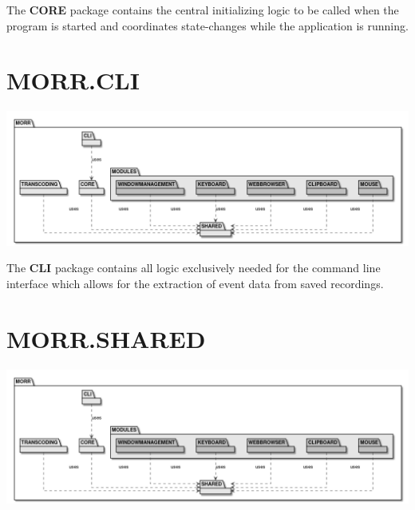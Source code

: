 The \textbf{CORE} package contains the central initializing logic to be called when the program is started and coordinates state-changes while the application is running.

\begin{packclass}
\end{packclass}

\begin{packif}
\end{packif}

\newpage
\section{MORR.CLI}

\begin{center}
    \includegraphics[width=1.0\textwidth]{resources/Packages/AllPackages.png}
\end{center}

The \textbf{CLI} package contains all logic exclusively needed for the command line interface which allows for the extraction of event data from saved recordings.

\begin{packclass}
\end{packclass}

\newpage
\section{MORR.SHARED}

\begin{center}
    \includegraphics[width=1.0\textwidth]{resources/Packages/AllPackages.png}
\end{center}

